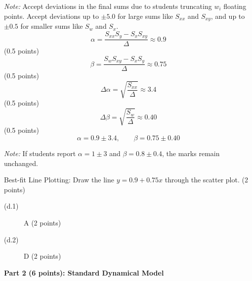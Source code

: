 \begin{description}
  \textit{Note:} Accept deviations in the final sums due to students
  truncating $w_i$ floating points. Accept deviations up to $\pm 5.0$ for
  large sums like $S_{xx}$ and $S_{xy}$, and up to $\pm 0.5$ for smaller sums
  like $S_w$ and $S_x$.
  \[ \alpha = \frac{S_{xx} S_y - S_x S_{xy}}{\Delta} \approx 0.9 \]
  \hfill(0.5 points)
  \[ \beta = \frac{S_w S_{xy} - S_x S_y}{\Delta} \approx 0.75 \]
  \hfill(0.5 points)
  \[ \Delta\alpha = \sqrt{\frac{S_{xx}}{\Delta}} \approx 3.4 \]
  \hfill(0.5 points)
  \[ \Delta\beta = \sqrt{\frac{S_w}{\Delta}} \approx 0.40 \]
  \hfill(0.5 points)
  \[ \alpha = 0.9 \pm 3.4, \qquad \beta = 0.75 \pm 0.40 \]

  \textit{Note:} If students report $\alpha = 1 \pm 3$ and
  $\beta = 0.8 \pm 0.4$, the marks remain unchanged.

  Best-fit Line Plotting: Draw the line $y = 0.9 + 0.75x$ through the scatter
  plot. \hfill(2 points)

\item[(d)]
  \begin{description}
  \item[(d.1)] A \hfill(2 points)
  \item[(d.2)] D \hfill(2 points)
  \end{description}
\end{description}

\medskip\noindent\textbf{Part 2 (6 points): Standard Dynamical Model}

